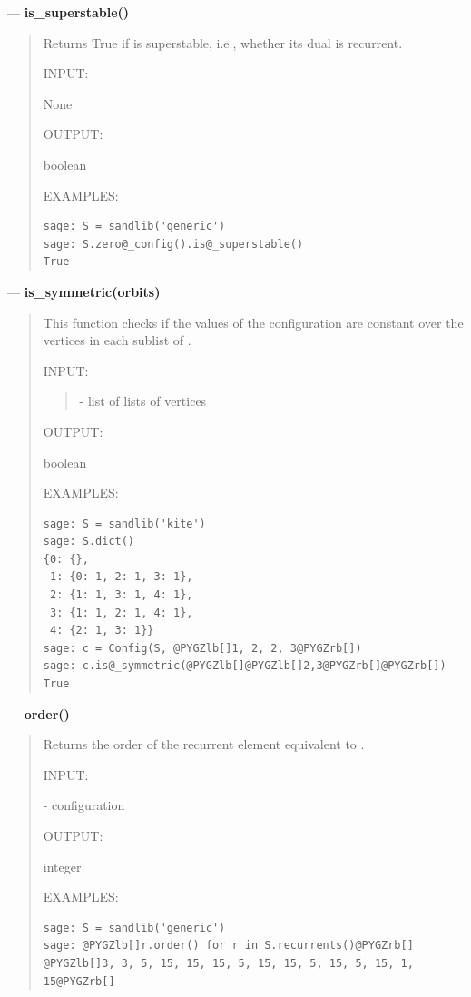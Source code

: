 \documentclass[letterpaper,10pt,english]{manual}
\begin{document}
---
\hypertarget{is-superstable}{}
\textbf{is\_superstable()}
\begin{quote}

Returns True if  is superstable, i.e., whether its dual is
recurrent.

INPUT:

None

OUTPUT:

boolean

EXAMPLES:

\begin{Verbatim}[commandchars=@\[\]]
sage: S = sandlib('generic')
sage: S.zero@_config().is@_superstable()
True
\end{Verbatim}
\end{quote}

---
\hypertarget{is-symmetric-orbits}{}
\textbf{is\_symmetric(orbits)}
\begin{quote}

This function checks if the values of the configuration are constant
over the vertices in each sublist of .

INPUT:
\begin{quote}

 - list of lists of vertices
\end{quote}

OUTPUT:

boolean

EXAMPLES:

\begin{Verbatim}[commandchars=@\[\]]
sage: S = sandlib('kite')
sage: S.dict()
{0: {},
 1: {0: 1, 2: 1, 3: 1},
 2: {1: 1, 3: 1, 4: 1},
 3: {1: 1, 2: 1, 4: 1},
 4: {2: 1, 3: 1}}
sage: c = Config(S, @PYGZlb[]1, 2, 2, 3@PYGZrb[])
sage: c.is@_symmetric(@PYGZlb[]@PYGZlb[]2,3@PYGZrb[]@PYGZrb[])
True
\end{Verbatim}
\end{quote}

---
\hypertarget{order}{}
\textbf{order()}
\begin{quote}

Returns the order of the recurrent element equivalent to .

INPUT:

 - configuration

OUTPUT:

integer

EXAMPLES:

\begin{Verbatim}[commandchars=@\[\]]
sage: S = sandlib('generic')
sage: @PYGZlb[]r.order() for r in S.recurrents()@PYGZrb[]
@PYGZlb[]3, 3, 5, 15, 15, 15, 5, 15, 15, 5, 15, 5, 15, 1, 15@PYGZrb[]
\end{Verbatim}
\end{quote}
\end{document}
